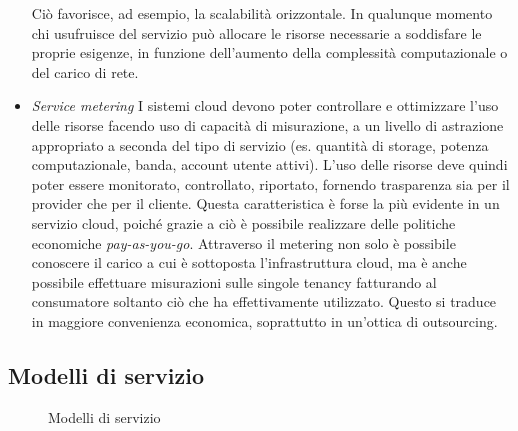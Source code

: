 \begin{itemize}
Ciò favorisce, ad esempio, la scalabilità orizzontale. In qualunque momento chi usufruisce del servizio può allocare le risorse necessarie a soddisfare le proprie esigenze, in funzione dell'aumento della complessità computazionale o del carico di rete.
\item \textit{Service metering} I sistemi cloud devono poter controllare e ottimizzare l'uso delle risorse facendo uso di capacità di misurazione, a un livello di astrazione appropriato a seconda del tipo di servizio (es. quantità di storage, potenza computazionale, banda, account utente attivi). L'uso delle risorse deve quindi poter essere monitorato, controllato, riportato, fornendo trasparenza sia per il provider che per il cliente.
Questa caratteristica è forse la più evidente in un servizio cloud, poiché grazie a ciò è possibile realizzare delle politiche economiche \textit{pay-as-you-go}.
Attraverso il metering non solo è possibile conoscere il carico a cui è sottoposta l'infrastruttura cloud, ma è anche possibile effettuare misurazioni sulle singole tenancy fatturando al consumatore soltanto ciò che ha effettivamente utilizzato.
Questo si traduce in maggiore convenienza economica, soprattutto in un'ottica di outsourcing.
\end{itemize}
\subsection{Modelli di servizio}

\begin{figure}[H]
\centering
{}
\caption{Modelli di servizio}\label{fig:modelliservizio}
\end{figure}

